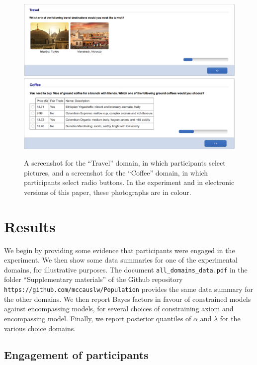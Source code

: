 \documentclass[11pt,letter]{article}
\begin{document}
\begin{figure}
	\begin{center}
	\includegraphics[width=15cm]{Population_study_design/screenshot_Travel.png}
	\includegraphics[width=15cm]{Population_study_design/screenshot_Coffee.png}
	\caption{A screenshot for the ``Travel'' domain, in which participants select pictures, and a screenshot for the ``Coffee'' domain, in which participants select radio buttons. In the experiment and in electronic versions of this paper, these photographs are in colour.}\label{f:screenshots}
	\end{center}
\end{figure}

\section{Results}\label{s:results}

We begin by providing some evidence that participants were engaged in the experiment.
We then show some data summaries for one of the experimental domains, for illustrative purposes.
The document \texttt{all\_domains\_data.pdf} in the folder ``Supplementary materials'' of the Github repository \texttt{https://github.com/mccauslw/Population} provides the same data summary for the other domains.
We then report Bayes factors in favour of constrained models against encompassing models, for several choices of constraining axiom and encompassing model.
Finally, we report posterior quantiles of $\alpha$ and $\lambda$ for the various choice domains.

\subsection{Engagement of participants}
\end{document}
